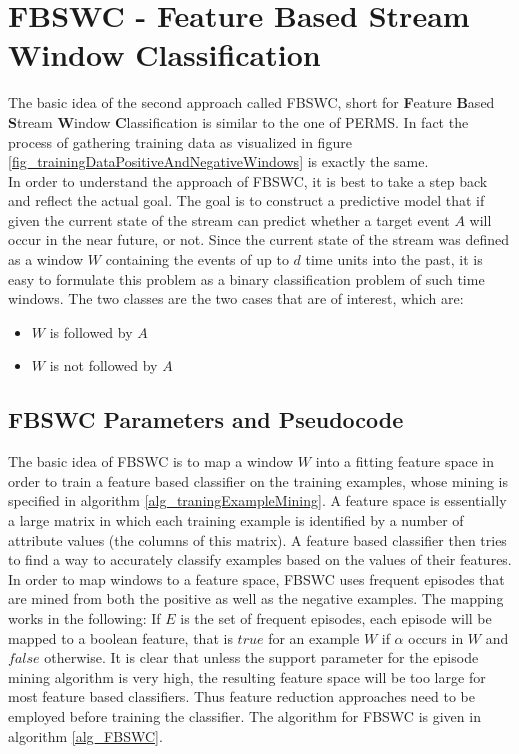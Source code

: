\section{FBSWC - Feature Based Stream Window Classification}
\label{sec_FeatureBasedStreamWindowClassification}

The basic idea of the second approach called FBSWC, short for \textbf{F}eature \textbf{B}ased \textbf{S}tream \textbf{W}indow \textbf{C}lassification is similar to the one of PERMS. In fact the process of gathering training data as visualized in figure \ref{fig_trainingDataPositiveAndNegativeWindows} is exactly the same. \\
In order to understand the approach of FBSWC, it is best to take a step back and reflect the actual goal. The goal is to construct a predictive model that if given the current state of the stream can predict whether a target event $A$ will occur in the near future, or not. Since the current state of the stream was defined as a window $W$ containing the events of up to $d$ time units into the past, it is easy to formulate this problem as a binary classification problem of such time windows. The two classes are the two cases that are of interest, which are:

\begin{itemize}
	\item $W$ is followed by $A$
	\item $W$ is not followed by $A$
\end{itemize}

\subsection{FBSWC Parameters and Pseudocode}

The basic idea of FBSWC is to map a window $W$ into a fitting feature space in order to train a feature based classifier on the training examples, whose mining is specified in algorithm \ref{alg_traningExampleMining}. A feature space is essentially a large matrix in which each training example is identified by a number of attribute values (the columns of this matrix). A feature based classifier then tries to find a way to accurately classify examples based on the values of their features. In order to map windows to a feature space, FBSWC uses frequent episodes that are mined from both the positive as well as the negative examples. The mapping works in the following: If $E$ is the set of frequent episodes, each episode will be mapped to a boolean feature, that is $true$ for an example $W$ if $\alpha$ occurs in $W$ and $false$ otherwise. It is clear that unless the support parameter for the episode mining algorithm is very high, the resulting feature space will be too large for most feature based classifiers. Thus feature reduction approaches need to be employed before training the classifier. The algorithm for FBSWC is given in algorithm \ref{alg_FBSWC}.

